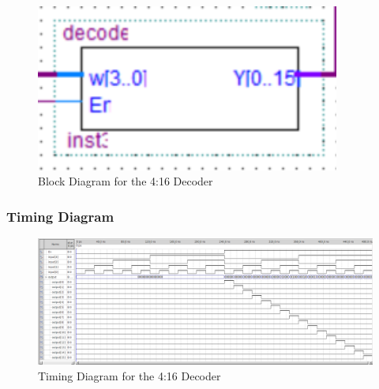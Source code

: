 		\begin{figure}[H]
			\centering
			\includegraphics[width=10cm]{Pictures/decoder.png}
			\caption{{Block Diagram for the 4:16 Decoder}}
			\label{}
		\end{figure}
	
	\subsubsection{{Timing Diagram}}
	
		\begin{figure}[H]
			\centering
			\includegraphics[width=15cm]{Pictures/DecoderWaveForm.png}
			\caption{{Timing Diagram for the 4:16 Decoder}}
			\label{}
		\end{figure}

